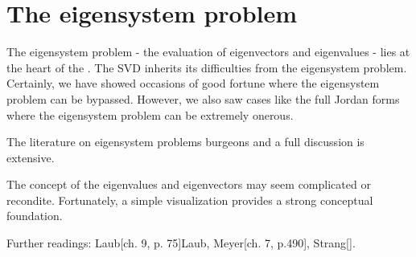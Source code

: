\chapter{The eigensystem problem}

The eigensystem problem - the evaluation of eigenvectors and eigenvalues - lies at the heart of the \svdp. The SVD inherits its difficulties from the eigensystem problem. Certainly, we have showed occasions of good fortune where the eigensystem problem can be bypassed. However, we also saw cases like the full Jordan forms where the eigensystem problem can be extremely onerous.

The literature on eigensystem problems burgeons and a full discussion is extensive.

The concept of the eigenvalues and eigenvectors may seem complicated or recondite. Fortunately, a simple visualization provides a strong conceptual foundation.

Further readings: Laub[ch. 9, p. 75]{Laub}, Meyer[ch. 7, p.490]{}, Strang[]{}.

\endinput